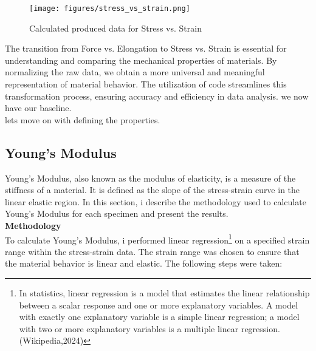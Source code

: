 \documentclass{article}
\begin{document}
 \begin{figure}[H]
     \centering
     \texttt{[image: figures/stress\_vs\_strain.png]}
     \caption{Calculated produced data for Stress vs. Strain}
     \label{fig:stress_strain}
 \end{figure} 
 The transition from Force vs. Elongation to Stress vs. Strain is essential for understanding and comparing the mechanical properties of materials. By normalizing the raw data, we obtain a more universal and meaningful representation of material behavior. The utilization of code streamlines this transformation process, ensuring accuracy and efficiency in data analysis.
    we now have our baseline.\\
    lets move on with defining the properties.
   \newpage
\subsection{Young's Modulus}

Young's Modulus, also known as the modulus of elasticity, is a measure of the stiffness of a material. It is defined as the slope of the stress-strain curve in the linear elastic region. In this section, i describe the methodology used to calculate Young's Modulus for each specimen and present the results.\\[8pt]

\textbf{Methodology}\\[8pt]

To calculate Young's Modulus, i performed linear regression\footnote{In statistics, linear regression is a model that estimates the linear relationship between a scalar response and one or more explanatory variables. A model with exactly one explanatory variable is a simple linear regression; a model with two or more explanatory variables is a multiple linear regression. (Wikipedia,2024)} on a specified strain range within the stress-strain data. The strain range was chosen to ensure that the material behavior is linear and elastic. The following steps were taken:
\end{document}
